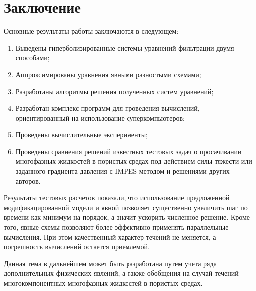 \chapter*{Заключение}                       %


Основные результаты работы заключаются в следующем:
\begin{enumerate}
 \item Выведены гиперболизированные системы уравнений фильтрации двумя способами;
 \item Аппроксимированы уравнения явными разностыми схемами;
 \item Разработаны алгоритмы решения полученных систем уравнений;
 \item Разработан комплекс программ для проведения вычислений, ориентированный на использование суперкомпьютеров;
 \item Проведены вычислительные эксперименты;
 \item Проведены сравнения решений известных тестовых задач о просачивании многофазных жидкостей в пористых средах под действием силы тяжести или заданного градиента давления с IMPES-методом и решениями других авторов.
\end{enumerate}

Результаты тестовых расчетов показали, что использование предложенной модификацированной модели и явной позволяет существенно увеличить шаг по времени как минимум на порядок, а значит ускорить численное решение. Кроме того, явные схемы позволяют более эффективно применять параллельные вычисления.
При этом качественный характер течений не меняется, а погрешность вычислений остается приемлемой.

Данная тема в дальнейшем может быть разработана путем учета ряда дополнительных физических явлений, а также обобщения на случай течений многокомпонентных многофазных жидкостей в пористых средах.
